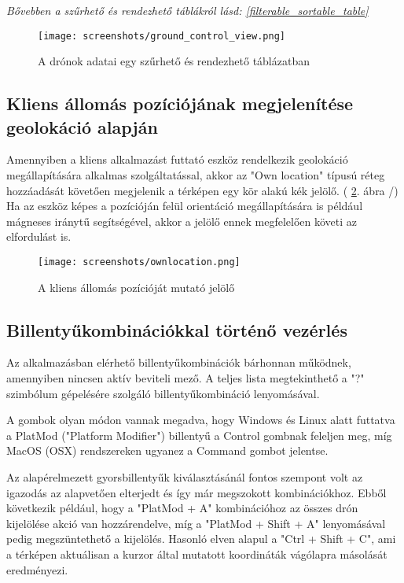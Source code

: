 \textit{
  Bővebben a szűrhető és rendezhető táblákról lásd:
  \ref{filterable_sortable_table}
}

\begin{figure}[H]
  \texttt{[image: screenshots/ground\_control\_view.png]}
  \caption{A drónok adatai egy szűrhető és rendezhető táblázatban}
  \label{fig:ground_control_view}
\end{figure}

\subsection{Kliens állomás pozíciójának megjelenítése geolokáció alapján}

Amennyiben a kliens alkalmazást futtató eszköz rendelkezik geolokáció
megállapítására alkalmas szolgáltatással, akkor az "Own location" típusú réteg
hozzáadását követően megjelenik a térképen egy kör alakú kék jelölő.
( \ref{fig:ownlocation}. ábra /) Ha az eszköz képes a pozícióján felül
orientáció megállapítására is például mágneses iránytű segítségével, akkor a
jelölő ennek megfelelően követi az elfordulást is.

\begin{figure}[H]
  \texttt{[image: screenshots/ownlocation.png]}
  \caption{A kliens állomás pozícióját mutató jelölő}
  \label{fig:ownlocation}
\end{figure}

\newpage

\subsection{Billentyűkombinációkkal történő vezérlés}

Az alkalmazásban elérhető billentyűkombinációk bárhonnan működnek, amennyiben
nincsen aktív beviteli mező. A teljes lista megtekinthető a "?" szimbólum
gépelésére szolgáló billentyűkombináció lenyomásával.

A gombok olyan módon vannak megadva, hogy Windows és Linux alatt futtatva a
PlatMod ("Platform Modifier") billentyű a Control gombnak feleljen meg, míg
MacOS (OSX) rendszereken ugyanez a Command gombot jelentse.

Az alapérelmezett gyorsbillentyűk kiválasztásánál fontos szempont volt az
igazodás az alapvetően elterjedt és így már megszokott kombinációkhoz. Ebből
következik például, hogy a "PlatMod + A" kombinációhoz az összes drón
kijelölése akció van hozzárendelve, míg a "PlatMod + Shift + A" lenyomásával
pedig megszüntethető a kijelölés. Hasonló elven alapul a "Ctrl + Shift + C", ami
a térképen aktuálisan a kurzor által mutatott koordináták vágólapra másolását
eredményezi.

